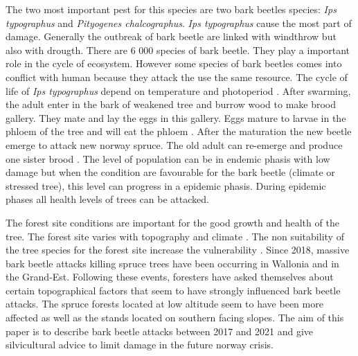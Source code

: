 \documentclass[3p,procedia]{elsarticle}
\begin{document}

The two most important pest for this species are two  bark beetles species: \textit{Ips typographus} and \textit{Pityogenes chalcographus}. 
\textit{Ips typographus} cause the most part of damage. Generally the outbreak of bark beetle are linked with windthrow but also with drougth. 
There are 6 000 species of bark beetle. 
They play a important role in the cycle of ecosystem. 
However some species of bark beetles comes into conflict with human because they attack the use the same resource\citep{raffa_natural_2015}.%
The cycle of life of \textit{Ips typographus} depend on temperature and photoperiod \citep{baier_phenipscomprehensive_2007,annila_influence_1969}.
After swarming, the adult enter in the bark of weakened tree and burrow wood to make brood gallery.
They mate and lay the eggs in this gallery. 
Eggs mature to larvae in the phloem of the tree and will eat the phloem \citep{hlasny_bark_2021}.
After the maturation the new beetle emerge to attack new norway spruce.
The old adult can re-emerge and produce one sister brood \citep{zolubas_1995}.
The level of population can be in endemic phasis with low damage but when the condition are favourable for the bark beetle (climate or stressed tree), this level  
can progress in a epidemic phasis\citep{kautz_individual_2014}.
During epidemic phases all health levels of trees can be attacked.
 



The forest site conditions are important for the good growth and health of the tree.
The forest site varies with topography and climate \citep{brethes_typologie_1989}.
The non suitability of the tree species for the forest site increase the vulnerability \citep{jandl_climate-induced_2020}.
Since 2018, massive bark beetle attacks killing spruce trees have been occurring in Wallonia and in the Grand-Est. Following these events, foresters have asked themselves about certain topographical factors that seem to have strongly influenced bark beetle attacks. 
The spruce forests located at low altitude seem to have been more affected as well as the stands located on southern facing slopes.
The aim of this paper is to describe bark beetle attacks between 2017 and 2021 and give silvicultural advice to limit damage in the future norway crisis.  
\end{document}
